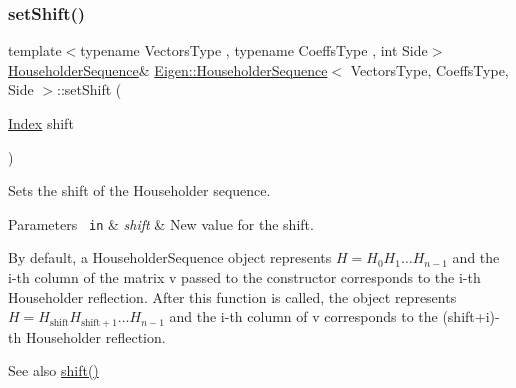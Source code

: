 \subsubsection{\texorpdfstring{setShift()}{setShift()}}
{\footnotesize\ttfamily template$<$typename Vectors\+Type , typename Coeffs\+Type , int Side$>$ \\
\mbox{\hyperlink{class_eigen_1_1_householder_sequence}{Householder\+Sequence}}\& \mbox{\hyperlink{class_eigen_1_1_householder_sequence}{Eigen\+::\+Householder\+Sequence}}$<$ Vectors\+Type, Coeffs\+Type, Side $>$\+::set\+Shift (\begin{DoxyParamCaption}\item[{\mbox{\hyperlink{struct_eigen_1_1_eigen_base_a554f30542cc2316add4b1ea0a492ff02}{Index}}}]{shift }\end{DoxyParamCaption})\hspace{0.3cm}{\ttfamily [inline]}}



Sets the shift of the Householder sequence. 


\begin{DoxyParams}[1]{Parameters}
\mbox{\texttt{ in}}  & {\em shift} & New value for the shift.\\
\hline
\end{DoxyParams}
By default, a Householder\+Sequence object represents $ H = H_0 H_1 \ldots H_{n-1} $ and the i-\/th column of the matrix {\ttfamily v} passed to the constructor corresponds to the i-\/th Householder reflection. After this function is called, the object represents $ H = H_{\mathrm{shift}} H_{\mathrm{shift}+1} \ldots H_{n-1} $ and the i-\/th column of {\ttfamily v} corresponds to the (shift+i)-\/th Householder reflection.

\begin{DoxySeeAlso}{See also}
\mbox{\hyperlink{class_eigen_1_1_householder_sequence_a34482bfad5563fd8a8a4264db76ac917}{shift()}} 
\end{DoxySeeAlso}
\mbox{\label{class_eigen_1_1_householder_sequence_ab8a9c969a9adcd392c9d481d6e9ccaef}} 
